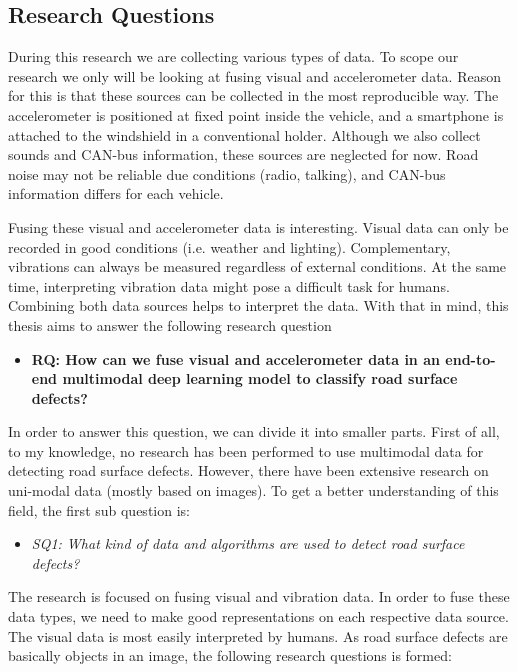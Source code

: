 \subsection{Research Questions}


During this research we are collecting various types of data. To scope our research we only will be looking at fusing visual and accelerometer data. Reason for this is that these sources can be collected in the most reproducible way. The accelerometer is positioned at fixed point inside the vehicle, and a smartphone is attached to the windshield in a conventional holder. Although we also collect sounds and CAN-bus information, these sources are neglected for now. Road noise may not be reliable due conditions (radio, talking), and CAN-bus information differs for each vehicle.

Fusing these visual and accelerometer data is interesting. Visual data can only be recorded in good conditions (i.e. weather and lighting). Complementary, vibrations can always be measured regardless of external conditions. At the same time, interpreting vibration data might pose a difficult task for humans. Combining both data sources helps to interpret the data. With that in mind, this thesis aims to answer the following research question

\begin{itemize}
\item \textbf{RQ: How can we fuse visual and accelerometer data in an end-to-end multimodal deep learning model to classify road surface defects?}
\end{itemize}

In order to answer this question, we can divide it into smaller parts. First of all, to my knowledge, no research has been performed to use multimodal data for detecting road surface defects. However, there have been extensive research on uni-modal data (mostly based on images). To get a better understanding of this field, the first sub question is:

\begin{itemize}
\item \textit{SQ1: What kind of data and algorithms are used to detect road surface defects?}
\end{itemize}

The research is focused on fusing visual and vibration data. In order to fuse these data types, we need to make good representations on each respective data source. The visual data is most easily interpreted by humans. As road surface defects are basically objects in an image, the following research questions is formed:

